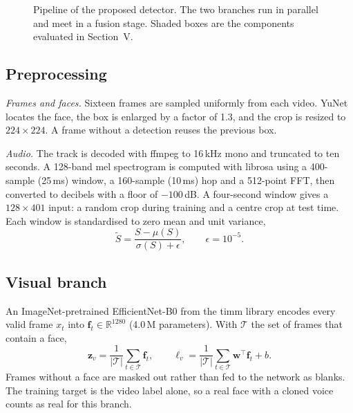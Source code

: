 \documentclass[conference]{IEEEtran}
\begin{document}
\begin{figure}[!t]
{}
\caption{Pipeline of the proposed detector. The two branches run in parallel and meet in a fusion stage. Shaded boxes are the components evaluated in Section~V.}
\label{fig:arch}
\end{figure}

\subsection{Preprocessing}
\emph{Frames and faces.} Sixteen frames are sampled uniformly from each video. YuNet \cite{wu2023yunet} locates the face, the box is enlarged by a factor of 1.3, and the crop is resized to $224\times224$. A frame without a detection reuses the previous box.

\emph{Audio.} The track is decoded with ffmpeg to 16\,kHz mono and truncated to ten seconds. A 128-band mel spectrogram is computed with librosa \cite{mcfee2015librosa} using a 400-sample (25\,ms) window, a 160-sample (10\,ms) hop and a 512-point FFT, then converted to decibels with a floor of $-100$\,dB. A four-second window gives a $128\times401$ input: a random crop during training and a centre crop at test time. Each window is standardised to zero mean and unit variance,
\begin{equation}
\tilde{S}=\frac{S-\mu(S)}{\sigma(S)+\epsilon},\qquad \epsilon=10^{-5}.
\end{equation}

\subsection{Visual branch}
An ImageNet-pretrained \cite{deng2009imagenet} EfficientNet-B0 \cite{tan2019efficientnet} from the timm library \cite{wightman2019timm} encodes every valid frame $x_t$ into $\mathbf f_t\in\mathbb R^{1280}$ (4.0\,M parameters). With $\mathcal T$ the set of frames that contain a face,
\begin{equation}
\mathbf z_v=\frac{1}{|\mathcal T|}\sum_{t\in\mathcal T}\mathbf f_t,\qquad
\ell_v=\frac{1}{|\mathcal T|}\sum_{t\in\mathcal T}\mathbf w^{\top}\mathbf f_t+b .
\end{equation}
Frames without a face are masked out rather than fed to the network as blanks. The training target is the video label alone, so a real face with a cloned voice counts as real for this branch.
\end{document}
